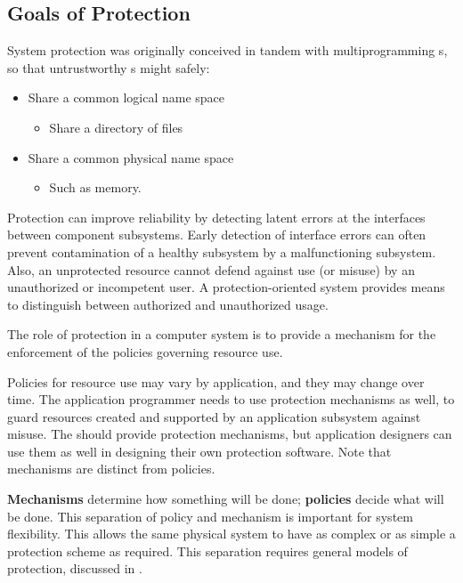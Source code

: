 \subsection{Goals of Protection}\label{subsec:Goals_of_Protection}
System protection was originally conceived in tandem with multiprogramming s, so that untrustworthy s might safely:
\begin{itemize}[noitemsep]
\item Share a common logical name space
  \begin{itemize}[noitemsep]
  \item Share a directory of files
  \end{itemize}
\item Share a common physical name space
  \begin{itemize}[noitemsep]
  \item Such as memory.
  \end{itemize}
\end{itemize}

Protection can improve reliability by detecting latent errors at the interfaces between component subsystems.
Early detection of interface errors can often prevent contamination of a healthy subsystem by a malfunctioning subsystem.
Also, an unprotected resource cannot defend against use (or misuse) by an unauthorized or incompetent user.
A protection-oriented system provides means to distinguish between authorized and unauthorized usage.

The role of protection in a computer system is to provide a mechanism for the enforcement of the policies governing resource use.

Policies for resource use may vary by application, and they may change over time.
The application programmer needs to use protection mechanisms as well, to guard resources created and supported by an application subsystem against misuse.
The  should provide protection mechanisms, but application designers can use them as well in designing their own protection software.
Note that mechanisms are distinct from policies.

\textbf{Mechanisms} determine how something will be done; \textbf{policies} decide what will be done.
This separation of policy and mechanism is important for system flexibility.
This allows the same physical system to have as complex or as simple a protection scheme as required.
This separation requires general models of protection, discussed in .

